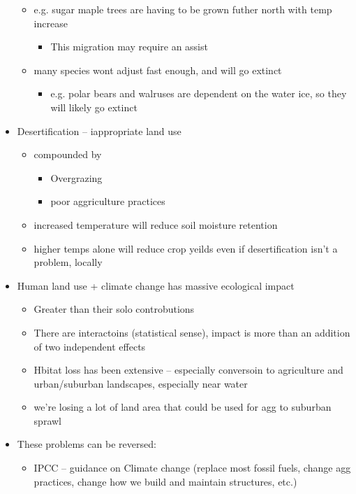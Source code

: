\documentclass{article}
\theoremstyle{definition}
\begin{document}
\begin{itemize}
\begin{itemize}
			\item e.g. sugar maple trees are having to be grown futher north with temp increase
				\begin{itemize}
					\item This migration may require an assist
				\end{itemize}
			\item many species wont adjust fast enough, and will go extinct
				\begin{itemize}
					\item e.g. polar bears and walruses are dependent on the water ice, so they will likely go extinct
				\end{itemize}
		\end{itemize}
	\item Desertification -- iappropriate land use\
		\begin{itemize}
			\item compounded by
				\begin{itemize}
					\item Overgrazing
					\item poor aggriculture practices
				\end{itemize}
			\item increased temperature will reduce soil moisture retention
			\item higher temps alone will reduce crop yeilds even if desertification isn't a problem, locally
		\end{itemize}
	\item Human land use + climate change has massive ecological impact
		\begin{itemize}
			\item Greater than their solo controbutions
			\item There are interactoins (statistical sense), impact is more than an addition of two independent effects
			\item Hbitat loss has been extensive -- especially conversoin to agriculture and urban/suburban landscapes, especially near water
			\item we're losing a lot of land area that could be used for agg to suburban sprawl
		\end{itemize}
	\item These problems can be reversed:
		\begin{itemize}
			\item IPCC -- guidance on Climate change (replace most fossil fuels, change agg practices, change how we build and maintain structures, etc.)

\end{itemize}
\end{itemize}
\end{document}
